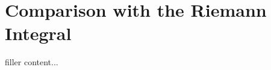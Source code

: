 \documentclass[../../templates/section]{subfiles}
\begin{document}
\section{Comparison with the Riemann Integral}\label{sec:comparison-with-the-riemann-integral}

filler content...
\end{document}
